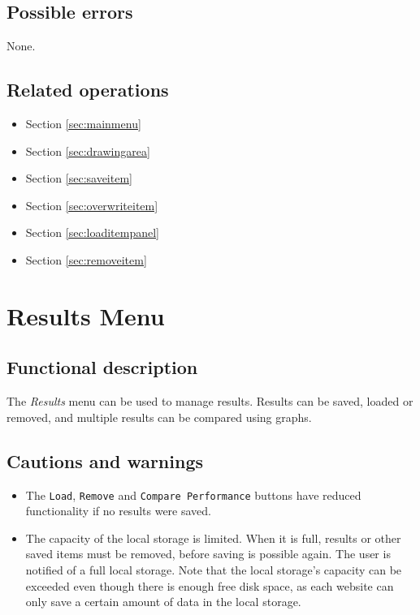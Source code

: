  \subsection*{Possible errors}
  None.

  \subsection*{Related operations}
  \begin{itemize}
    \item Section \ref{sec:mainmenu}
    \item Section \ref{sec:drawingarea}
    \item Section \ref{sec:saveitem}
    \item Section \ref{sec:overwriteitem}
    \item Section \ref{sec:loaditempanel}
    \item Section \ref{sec:removeitem}
  \end{itemize}

\section{Results Menu}\label{sec:resultsmenu}
  \subsection*{Functional description}
  The \emph{Results} menu can be used to manage results. Results can be saved, loaded or removed, and multiple results can be compared using graphs. 

  \subsection*{Cautions and warnings}
  \begin{itemize}
    \item The \texttt{Load}, \texttt{Remove} and \texttt{Compare Performance} buttons have reduced functionality if no results were saved.
    \item The capacity of the local storage is limited. When it is full, results or other saved \projectname{} items must be removed, before saving is possible again. The user is notified of a full local storage. Note that the local storage's capacity can be exceeded even though there is enough free disk space, as each website can only save a certain amount of data in the local storage.
  \end{itemize}  

